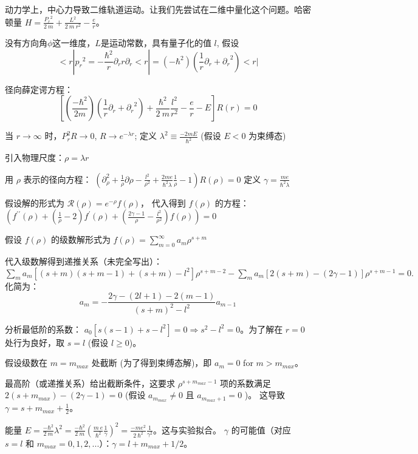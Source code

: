 \documentclass[12pt]{ctexart}
\begin{document}
动力学上，中心力导致二维轨道运动。让我们先尝试在二维中量化这个问题。哈密顿量 $H=\frac{{P_{r}}^{2}}{2~m}+\frac{L^{2}}{2~m~r^{2}}-\frac{e}{r}。$

没有方向角$\phi$这一维度，$L$是运动常数，具有量子化的值 $l$, 假设 $$<r|{p_{r}}^{2}=-\frac{\hbar^{2}}{r}\partial_{r}r\partial_{r}<r| = (-\hbar^{2})(\frac{1}{r}\partial_{r}+{\partial_{r}}^{2})<r|$$ 

径向薛定谔方程： $$[(\frac{-\hbar^{2}}{2m})(\frac{1}{r}\partial_{r}+{\partial_{r}}^{2})+\frac{\hbar^{2}}{2~m}\frac{l^{2}}{r^{2}}-\frac{e}{r}-E]R(r)=0$$

当 $r \rightarrow \infty$ 时，$P_{r}^{2}R\rightarrow 0$, $R \rightarrow e^{-\lambda r}$;  定义 $\lambda^{2}\equiv\frac{-2mE}{\hbar^{2}}$ (假设 $E<0$ 为束缚态)

引入物理尺度：$\rho=\lambda r$

用 $\rho$ 表示的径向方程： $(\partial_{\rho}^{2}+\frac{1}{\rho}\partial\rho-\frac{l^{2}}{\rho^{2}}+\frac{2me}{\hbar^{2}\lambda}\frac{1}{\rho}-1) R(\rho)=0$ 定义 $\gamma = \frac{me}{\hbar^{2}\lambda}$

假设解的形式为 $\mathcal{R}(\rho)=e^{-\rho}f(\rho)$， 代入得到 $f(\rho)$ 的方程： $(f^{\prime\prime}(\rho)+(\frac{1}{\rho}-2)f^{\prime}(\rho) + (\frac{2\gamma-1}{\rho} - \frac{l^2}{\rho^2})f(\rho)) = 0$

假设 $f(\rho)$ 的级数解形式为 $f(\rho)=\sum_{m=0}^{\infty} a_{m}\rho^{s+m}$

代入级数解得到递推关系（未完全写出）： $\sum_{m}a_{m}[(s+m)(s+m-1)+(s+m)-l^{2}]\rho^{s+m-2}-\sum_{m}a_{m}[2(s+m)-(2\gamma-1)]\rho^{s+m-1}=0.$
化简为：$$a_{m}=-\frac{2\gamma-(2l+1)-2(m-1)}{(s+m)^2-l^2}a_{m-1}$$

分析最低阶的系数： $a_0[s(s-1)+s-l^2]=0 \Rightarrow s^{2}-l^{2}=0$。为了解在 $r=0$ 处行为良好，取 $s=l$ (假设 $l \ge 0$)。

假设级数在 $m=m_{max}$ 处截断 (为了得到束缚态解)，即 $a_{m}=0$ for $m>m_{max}$。

最高阶（或递推关系）给出截断条件，这要求 $\rho^{s+m_{max}-1}$ 项的系数满足 $2(s+m_{max}) - (2\gamma - 1) = 0$ (假设 $a_{m_{max}} \ne 0$ 且 $a_{m_{max}+1}=0$ )。 这导致 $\gamma=s+m_{max}+\frac{1}{2}$。

能量 $E = \frac{-\hbar^{2}}{2~m}\lambda^{2}=\frac{-\hbar^{2}}{2~m}(\frac{m~e}{\hbar^{2}}\frac{1}{\gamma})^{2}=\frac{-me^{2}}{2~\hbar^{2}}\frac{1}{\gamma^{2}}$。这与实验拟合。 $\gamma$ 的可能值（对应 $s=l$ 和 $m_{max}=0, 1, 2, ...$）：$\gamma = l+m_{max}+1/2$。
\end{document}
